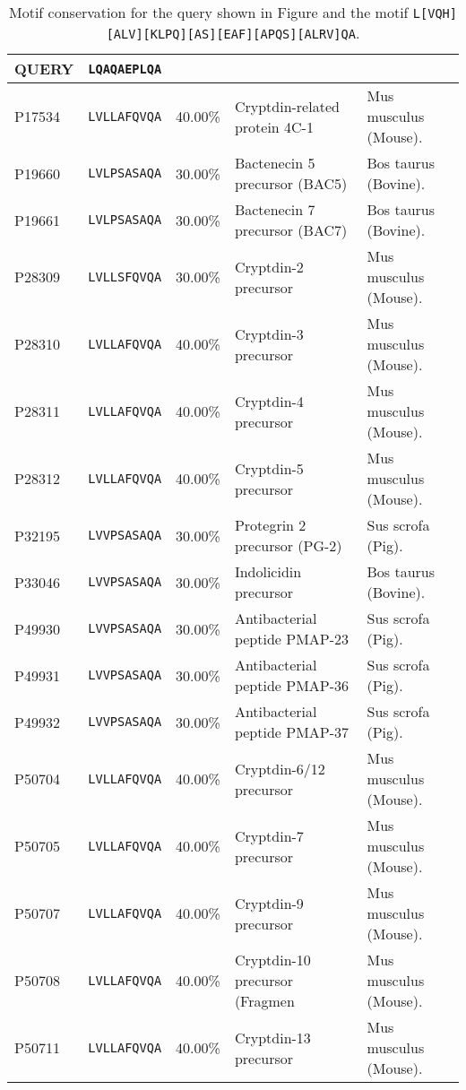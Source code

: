 \begin{sidewaystable}[ptbh]
    \caption[Motif conservation]{Motif conservation for the query shown in Figure and the motif \texttt{L[VQH][ALV][KLPQ][AS][EAF][APQS][ALRV]QA}.}
	\label{table:cons}
	\centering 
    \begin{tabular}{lllll} \hline\hline
QUERY		&	\texttt{LQAQAEPLQA}\\	\hline
P17534	&	\texttt{LVLLAFQVQA}	&	40.00\%	&	Cryptdin-related protein 4C-1	&	  Mus musculus (Mouse). \\
P19660	&	\texttt{LVLPSASAQA}	&	30.00\%	&	Bactenecin 5 precursor (BAC5)	&	  Bos taurus (Bovine). \\
P19661	&	\texttt{LVLPSASAQA}	&	30.00\%	&	Bactenecin 7 precursor (BAC7)	&	  Bos taurus (Bovine). \\
P28309	&	\texttt{LVLLSFQVQA}	&	30.00\%	&	Cryptdin-2 precursor	&	  Mus musculus (Mouse). \\
P28310	&	\texttt{LVLLAFQVQA}	&	40.00\%	&	Cryptdin-3 precursor	&	  Mus musculus (Mouse). \\
P28311	&	\texttt{LVLLAFQVQA}	&	40.00\%	&	Cryptdin-4 precursor	&	  Mus musculus (Mouse). \\
P28312	&	\texttt{LVLLAFQVQA}	&	40.00\%	&	Cryptdin-5 precursor	&	  Mus musculus (Mouse). \\
P32195	&	\texttt{LVVPSASAQA}	&	30.00\%	&	Protegrin 2 precursor (PG-2)	&	  Sus scrofa (Pig). \\
P33046	&	\texttt{LVVPSASAQA}	&	30.00\%	&	Indolicidin precursor	&	  Bos taurus (Bovine). \\
P49930	&	\texttt{LVVPSASAQA}	&	30.00\%	&	Antibacterial peptide PMAP-23	&	  Sus scrofa (Pig). \\
P49931	&	\texttt{LVVPSASAQA}	&	30.00\%	&	Antibacterial peptide PMAP-36	&	  Sus scrofa (Pig). \\
P49932	&	\texttt{LVVPSASAQA}	&	30.00\%	&	Antibacterial peptide PMAP-37	&	  Sus scrofa (Pig). \\
P50704	&	\texttt{LVLLAFQVQA}	&	40.00\%	&	Cryptdin-6/12 precursor	&	  Mus musculus (Mouse). \\
P50705	&	\texttt{LVLLAFQVQA}	&	40.00\%	&	Cryptdin-7 precursor	&	  Mus musculus (Mouse). \\
P50707	&	\texttt{LVLLAFQVQA}	&	40.00\%	&	Cryptdin-9 precursor	&	  Mus musculus (Mouse). \\
P50708	&	\texttt{LVLLAFQVQA}	&	40.00\%	&	Cryptdin-10 precursor (Fragmen	&	  Mus musculus (Mouse). \\
P50711	&	\texttt{LVLLAFQVQA}	&	40.00\%	&	Cryptdin-13 precursor	&	  Mus musculus (Mouse). \\

\end{tabular}
\end{sidewaystable}
